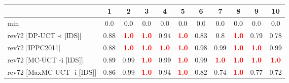 \documentclass{article}
\begin{document}
\begin{tabular}{|l|r@{$\pm$}rr@{$\pm$}rr@{$\pm$}rr@{$\pm$}rr@{$\pm$}rr@{$\pm$}rr@{$\pm$}rr@{$\pm$}rr@{$\pm$}rr@{$\pm$}r|}
\hline

& \multicolumn{2}{c}{1}
& \multicolumn{2}{c}{2}
& \multicolumn{2}{c}{3}
& \multicolumn{2}{c}{4}
& \multicolumn{2}{c}{5}
& \multicolumn{2}{c}{6}
& \multicolumn{2}{c}{7}
& \multicolumn{2}{c}{8}
& \multicolumn{2}{c}{9}
& \multicolumn{2}{c|}{10}
\\
\hline
\hline
min
& \multicolumn{2}{c}{0.0}
& \multicolumn{2}{c}{0.0}
& \multicolumn{2}{c}{0.0}
& \multicolumn{2}{c}{0.0}
& \multicolumn{2}{c}{0.0}
& \multicolumn{2}{c}{0.0}
& \multicolumn{2}{c}{0.0}
& \multicolumn{2}{c}{0.0}
& \multicolumn{2}{c}{0.0}
& \multicolumn{2}{c|}{0.0}
\\
rev72 [DP-UCT -i [IDS]]
& \multicolumn{2}{c}{0.88}
& \multicolumn{2}{c}{\textbf{\textcolor{red}{1.0}}}
& \multicolumn{2}{c}{\textbf{\textcolor{red}{1.0}}}
& \multicolumn{2}{c}{0.94}
& \multicolumn{2}{c}{\textbf{\textcolor{red}{1.0}}}
& \multicolumn{2}{c}{0.83}
& \multicolumn{2}{c}{0.8}
& \multicolumn{2}{c}{\textbf{\textcolor{red}{1.0}}}
& \multicolumn{2}{c}{0.79}
& \multicolumn{2}{c|}{0.78}
\\
rev72 [IPPC2011]
& \multicolumn{2}{c}{0.88}
& \multicolumn{2}{c}{\textbf{\textcolor{red}{1.0}}}
& \multicolumn{2}{c}{\textbf{\textcolor{red}{1.0}}}
& \multicolumn{2}{c}{\textbf{\textcolor{red}{1.0}}}
& \multicolumn{2}{c}{\textbf{\textcolor{red}{1.0}}}
& \multicolumn{2}{c}{0.98}
& \multicolumn{2}{c}{0.99}
& \multicolumn{2}{c}{\textbf{\textcolor{red}{1.0}}}
& \multicolumn{2}{c}{\textbf{\textcolor{red}{1.0}}}
& \multicolumn{2}{c|}{0.99}
\\
rev72 [MC-UCT -i [IDS]]
& \multicolumn{2}{c}{0.89}
& \multicolumn{2}{c}{0.99}
& \multicolumn{2}{c}{\textbf{\textcolor{red}{1.0}}}
& \multicolumn{2}{c}{0.99}
& \multicolumn{2}{c}{\textbf{\textcolor{red}{1.0}}}
& \multicolumn{2}{c}{0.99}
& \multicolumn{2}{c}{\textbf{\textcolor{red}{1.0}}}
& \multicolumn{2}{c}{\textbf{\textcolor{red}{1.0}}}
& \multicolumn{2}{c}{\textbf{\textcolor{red}{1.0}}}
& \multicolumn{2}{c|}{\textbf{\textcolor{red}{1.0}}}
\\
rev72 [MaxMC-UCT -i [IDS]]
& \multicolumn{2}{c}{0.86}
& \multicolumn{2}{c}{0.99}
& \multicolumn{2}{c}{\textbf{\textcolor{red}{1.0}}}
& \multicolumn{2}{c}{0.94}
& \multicolumn{2}{c}{\textbf{\textcolor{red}{1.0}}}
& \multicolumn{2}{c}{0.82}
& \multicolumn{2}{c}{0.74}
& \multicolumn{2}{c}{\textbf{\textcolor{red}{1.0}}}
& \multicolumn{2}{c}{0.77}
& \multicolumn{2}{c|}{0.72}
\\

\end{tabular}
\end{document}
